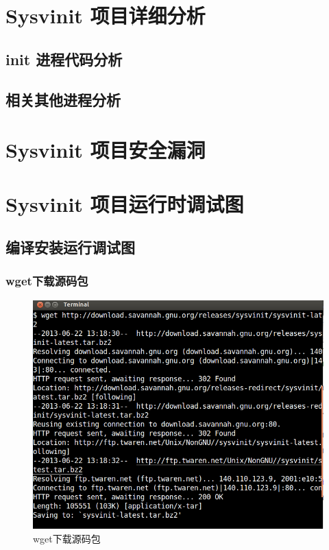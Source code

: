 \chapter{Sysvinit 项目详细分析}

\section{init 进程代码分析}

\section{相关其他进程分析}

\chapter{Sysvinit 项目安全漏洞}

\chapter{Sysvinit 项目运行时调试图}

\section{编译安装运行调试图}

\subsection{wget下载源码包}

\begin{figure}[htbp]
\centering
\includegraphics{./pictures/1-1-wget.png}
\caption{wget下载源码包}
\end{figure}

